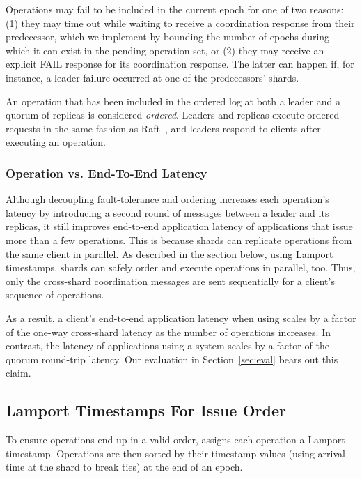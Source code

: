 Operations may fail to be included in the current epoch for one of two reasons:
(1) they may time out while waiting to receive a coordination response from their predecessor,
which we implement by bounding the number of epochs during which it can exist in the pending operation set,
or (2) they may receive an explicit FAIL response for its coordination response. The latter can happen
if, for instance, a leader failure occurred at one of the predecessors' shards.

An operation that has been included in the ordered log at both a leader and a quorum of replicas
is considered \textit{ordered}. Leaders and replicas execute ordered requests in the same fashion
as Raft~\cite{ongaro2014raft}, and leaders respond to clients after executing an operation.

\subsubsection{Operation vs. End-To-End Latency}

Although decoupling fault-tolerance and ordering increases each operation's latency by introducing a
second round of messages between a leader and its replicas, it still improves end-to-end application
latency of applications that issue more than a few operations. This is because shards can replicate
operations from the same client in parallel. As described in the section below, using Lamport timestamps,
shards can safely order and execute operations in parallel, too. Thus, only the cross-shard coordination
messages are sent sequentially for a client's sequence of operations.

As a result, a client's end-to-end application latency when using \sys{} scales by a factor
of the one-way cross-shard latency as the number of operations increases. In contrast,
the latency of applications using a \singledispatch{} system scales by a factor of the
quorum round-trip latency. Our evaluation in Section~\ref{sec:eval} bears out this claim.

\subsection{Lamport Timestamps For Issue Order}

To ensure operations end up in a valid \MDL{} order, \sys{} assigns each operation a Lamport timestamp.
Operations are then sorted by their timestamp values (using arrival time at the shard to break ties)
at the end of an epoch.

